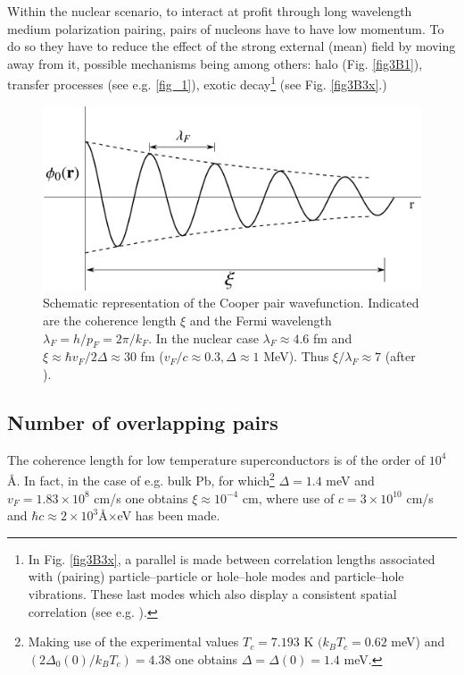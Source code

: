 \begin{subappendices}
     
     Within the nuclear scenario, to interact at profit through long wavelength medium polarization pairing, pairs of nucleons have to have low momentum. To do so they have to reduce the effect of the strong external (mean) field by moving away from it, possible mechanisms being among others: halo (Fig. \ref{fig3B1}), transfer processes (see e.g. \ref{fig_1}), exotic decay\footnote{In Fig. \ref{fig3B3x}, a parallel is made between correlation lengths associated with (pairing) particle--particle or hole--hole modes and particle--hole vibrations. These last modes which also display a consistent spatial correlation (see e.g. \cite{Broglia:71}).} (see Fig. \ref{fig3B3x}.)    

 \begin{figure}[h]
 	\centerline{\includegraphics*[width=12cm,angle=0	]{nutshell/figs/fig3B2}}
 	\caption{Schematic representation of the Cooper pair wavefunction. Indicated are the coherence length $\xi$ and the Fermi wavelength $\lambda_F=h/p_F=2\pi/k_F$. In the nuclear case $\lambda_F\approx4.6$ fm and $\xi\approx \hbar v_F/2\Delta\approx30$ fm ($v_F/c\approx0.3, \Delta\approx 1$ MeV). Thus $\xi/\lambda_F\approx 7$ (after \cite{Weisskopf:81}).}\label{fig3B2}
 \end{figure}
 





\subsection{Number of overlapping pairs}
 

The coherence length for low temperature superconductors is of the order of $10^4$\AA. In fact, in the case of e.g. bulk Pb, for which\footnote{\label{foot75} Making use of the experimental values $T_c=7.193$ K $(k_BT_c=0.62$ meV) and $(2\Delta_0(0)/k_BT_c)=4.38$ one obtains $\Delta=\Delta(0)=1.4$ meV.} $\Delta=1.4$ meV and $v_F=1.83\times10^8$ cm/s one obtains $\xi\approx10^{-4}$ cm, where use of $c=3\times10^{10}$ cm/s and $\hbar c\approx 2\times10^3 $\AA $\times$eV has been made. 



\end{subappendices}
